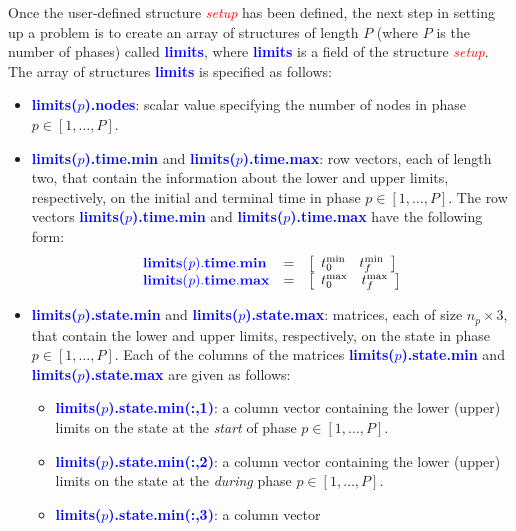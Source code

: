 \documentclass[10pt,final]{report}
\newcommand{\bfblue}[1]{\textcolor{blue}{\bf #1}}
\newcommand{\slred}[1]{\textcolor{red}{\sl #1}}
\begin{document}
Once the user-defined structure \slred{setup} has been defined, the next
step in setting up a problem is to create
an array of structures of length $P$ (where $P$ is the number of
phases) called \bfblue{limits}, where \bfblue{limits} is a
field of the structure \slred{setup}.  The array of structures
\bfblue{limits} is specified as follows:
\begin{itemize}
  \item \bfblue{limits($p$).nodes}: scalar value specifying the number of nodes in phase $p\in[1,\ldots,P]$.
  \item \bfblue{limits($p$).time.min} and \bfblue{limits($p$).time.max}:
    row vectors, each of length two, that contain the information
    about the lower and upper limits, respectively, on the initial and terminal time in phase
    $p\in[1,\ldots,P]$.  The row vectors
    \bfblue{limits($p$).time.min} and \bfblue{limits($p$).time.max} have the following form:
    \begin{displaymath}
      \begin{array}{lcl}
        \bfblue{limits(\textit{p}).time.min} & = & \left[\begin{array}{cc} t_0^{\textrm{min}} &
            t_f^{\textrm{min}} \end{array} \right] \\
        \bfblue{limits(\textit{p}).time.max} & = & \left[\begin{array}{cc} t_0^{\textrm{max}} &
            t_f^{\textrm{max}} \end{array} \right]
      \end{array}
    \end{displaymath}
  \item \bfblue{limits($p$).state.min} and \bfblue{limits($p$).state.max}:
    matrices, each of size $n_p \times 3$,
    that contain the lower and upper limits, respectively, on the
    state in phase $p\in[1,\ldots,P]$.  Each of the columns of the
    matrices \bfblue{limits($p$).state.min} and
    \bfblue{limits($p$).state.max} are given as follows:
    \begin{itemize}
      \item \bfblue{limits($p$).state.min(:,1)}: a column vector
        containing the lower (upper) limits on the state at the {\em
          start} of phase $p\in[1,\ldots,P]$.
      \item \bfblue{limits($p$).state.min(:,2)}: a column vector
        containing the lower (upper) limits on the state at the {\em
          during} phase $p\in[1,\ldots,P]$.
      \item \bfblue{limits($p$).state.min(:,3)}: a column vector

\end{itemize}
\end{itemize}
\end{document}
